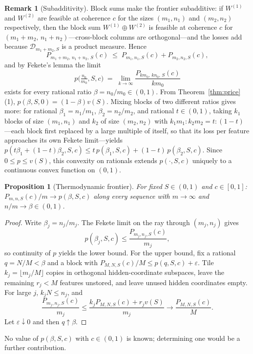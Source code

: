 \documentclass[11pt]{amsart}
\theoremstyle{plain}
\newtheorem{proposition}[theorem]{Proposition}
\theoremstyle{definition}
\newtheorem{remark}[theorem]{Remark}
\begin{document}
\begin{remark}[Subadditivity]\label{rem:fekete}
Block sums make the frontier subadditive: if $W^{(1)}$ and $W^{(2)}$ are feasible at coherence $c$ for the sizes $(m_1,n_1)$ and $(m_2,n_2)$ respectively, then the block sum $W^{(1)}\oplus W^{(2)}$ is feasible at coherence $c$ for $(m_1+m_2,\,n_1+n_2)$---cross-block columns are orthogonal---and the losses add because $\mathcal D_{m_1+m_2,S}$ is a product measure. Hence
\[
P_{m_1+m_2,\,n_1+n_2,\,S}(c)\;\le\; P_{m_1,n_1,S}(c)+P_{m_2,n_2,S}(c),
\]
and by Fekete's lemma the limit
\[
p\bigl(\tfrac{n_0}{m_0},S,c\bigr) \;=\; \lim_{k\to\infty} \frac{P_{km_0,\,kn_0,\,S}(c)}{km_0}
\]
exists for every rational ratio $\beta = n_0/m_0\in(0,1)$. From Theorem~\ref{thm:price}(1), $p(\beta,S,0)=(1-\beta)v(S)$. Mixing blocks of two different ratios gives more: for rational $\beta_1=n_1/m_1$, $\beta_2=n_2/m_2$, and rational $t\in(0,1)$, taking $k_1$ blocks of size $(m_1,n_1)$ and $k_2$ of size $(m_2,n_2)$ with $k_1m_1:k_2m_2=t:(1-t)$---each block first replaced by a large multiple of itself, so that its loss per feature approaches its own Fekete limit---yields $p(t\beta_1+(1-t)\beta_2,S,c)\le t\,p(\beta_1,S,c)+(1-t)\,p(\beta_2,S,c)$. Since $0\le p\le v(S)$, this convexity on rationals extends $p(\cdot,S,c)$ uniquely to a continuous convex function on $(0,1)$.
\end{remark}

\begin{proposition}[Thermodynamic frontier]\label{conj:limit}
For fixed $S\in(0,1)$ and $c\in[0,1]$: $P_{m,n,S}(c)/m \to p(\beta,S,c)$ along every sequence with $m\to\infty$ and $n/m\to\beta\in(0,1)$.
\end{proposition}

\begin{proof}
Write $\beta_j=n_j/m_j$. The Fekete limit on the ray through $(m_j,n_j)$ gives
\[
p(\beta_j,S,c)\le \frac{P_{m_j,n_j,S}(c)}{m_j},
\]
so continuity of $p$ yields the lower bound. For the upper bound, fix a rational $q=N/M<\beta$ and a block with $P_{M,N,S}(c)/M\le p(q,S,c)+\varepsilon$. Tile $k_j=\lfloor m_j/M\rfloor$ copies in orthogonal hidden-coordinate subspaces, leave the remaining $r_j<M$ features unstored, and leave unused hidden coordinates empty. For large $j$, $k_jN\le n_j$, and
\[
\frac{P_{m_j,n_j,S}(c)}{m_j}
\le \frac{k_jP_{M,N,S}(c)+r_jv(S)}{m_j}
\longrightarrow \frac{P_{M,N,S}(c)}M .
\]
Let $\varepsilon\downarrow0$ and then $q\uparrow\beta$.
\end{proof}

No value of $p(\beta,S,c)$ with $c\in(0,1)$ is known; determining one would be a further contribution.
\end{document}

